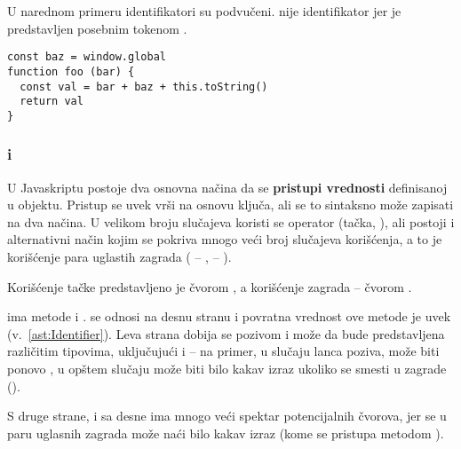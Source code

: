 U narednom primeru identifikatori su podvučeni.
 nije identifikator jer je predstavljen posebnim tokenom .

\begin{lstlisting}[keywords={baz, window, global, foo, bar, val, toString},keywordstyle={\underbar}]
const baz = window.global
function foo (bar) {
  const val = bar + baz + this.toString()
  return val
}
\end{lstlisting}

\subsubsection{ i }
\label{ast:PropertyAccessExpression}
\label{ast:ElementAccessExpression}

U Javaskriptu postoje dva osnovna načina da se \textbf{pristupi vrednosti} definisanoj u objektu.
Pristup se uvek vrši na osnovu ključa, ali se to sintaksno može zapisati na dva načina.
U velikom broju slučajeva koristi se operator  (tačka, ), ali postoji i alternativni način kojim se pokriva mnogo veći broj slučajeva korišćenja, a to je korišćenje para uglastih zagrada (\code{[} -- , \code{]} -- ).

Korišćenje tačke predstavljeno je čvorom , a korišćenje zagrada -- čvorom .

 ima metode  i .
 se odnosi na desnu stranu i povratna vrednost ove metode je uvek  (v.~\cref{ast:Identifier}).
Leva strana dobija se pozivom  i može da bude predstavljena različitim tipovima, uključujući i  -- na primer, u slučaju lanca poziva, može biti ponovo , u opštem slučaju može biti bilo kakav izraz ukoliko se smesti u zagrade ().

S druge strane,  i sa desne ima mnogo veći spektar potencijalnih čvorova, jer se u paru uglasnih zagrada može naći bilo kakav izraz (kome se pristupa metodom ).

\subsubsection{}
\label{sec:sk:call-expression}

